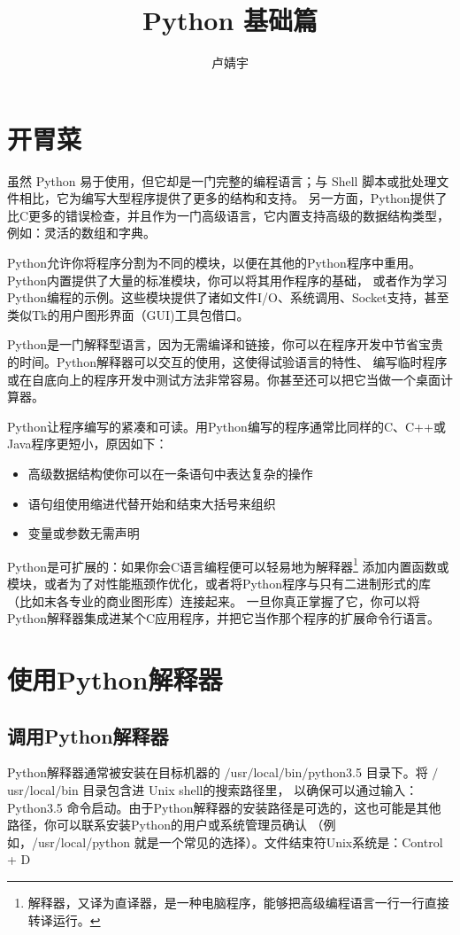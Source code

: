 \documentclass[UTF8]{ctexart}
\title{\heiti Python 基础篇}
\author{卢婧宇}
\begin{document}
\maketitle
\tableofcontents

\newpage
\section{开胃菜}
虽然 Python 易于使用，但它却是一门完整的编程语言；与 Shell 脚本或批处理文件相比，它为编写大型程序提供了更多的结构和支持。
另一方面，Python提供了比C更多的错误检查，并且作为一门高级语言，它内置支持高级的数据结构类型，例如：灵活的数组和字典。

Python允许你将程序分割为不同的模块，以便在其他的Python程序中重用。Python内置提供了大量的标准模块，你可以将其用作程序的基础，
或者作为学习Python编程的示例。这些模块提供了诸如文件I/O、系统调用、Socket支持，甚至类似Tk的用户图形界面（GUI)工具包借口。

Python是一门解释型语言，因为无需编译和链接，你可以在程序开发中节省宝贵的时间。Python解释器可以交互的使用，这使得试验语言的特性、
编写临时程序或在自底向上的程序开发中测试方法非常容易。你甚至还可以把它当做一个桌面计算器。

Python让程序编写的紧凑和可读。用Python编写的程序通常比同样的C、C++或Java程序更短小，原因如下：
\begin{itemize}
  \item 高级数据结构使你可以在一条语句中表达复杂的操作
  \item 语句组使用缩进代替开始和结束大括号来组织
  \item 变量或参数无需声明
\end{itemize}

Python是可扩展的：如果你会C语言编程便可以轻易地为解释器\footnote{解释器，又译为直译器，是一种电脑程序，能够把高级编程语言一行一行直接转译运行。}
添加内置函数或模块，或者为了对性能瓶颈作优化，或者将Python程序与只有二进制形式的库（比如末各专业的商业图形库）连接起来。
一旦你真正掌握了它，你可以将Python解释器集成进某个C应用程序，并把它当作那个程序的扩展命令行语言。
\section{使用Python解释器}
\subsection{调用Python解释器}
Python解释器通常被安装在目标机器的 $/$usr$/$local$/$bin$/$python3.5 目录下。将 $/$usr$/$local$/$bin 目录包含进 Unix shell的搜索路径里，
以确保可以通过输入：Python3.5 命令启动。由于Python解释器的安装路径是可选的，这也可能是其他路径，你可以联系安装Python的用户或系统管理员确认
（例如，/usr/local/python 就是一个常见的选择）。文件结束符Unix系统是：Control + D
\end{document}
